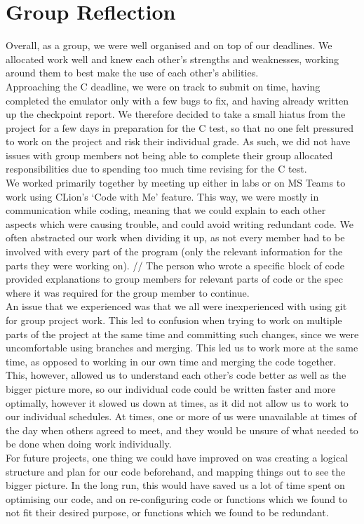 \documentclass [10pt] {article}
\begin{document}
\section*{Group Reflection}
Overall, as a group, we were well organised and on top of our deadlines. We allocated work well and knew each other's strengths and weaknesses, working around them to best make the use of each other's abilities.
\vspace {0.3cm}
\\
Approaching the C deadline, we were on track to submit on time, having completed the emulator only with a few bugs to fix, and having already written up the checkpoint report. We therefore decided to take a small hiatus from the project for a few days in preparation for the C test, so that no one felt pressured to work on the project and risk their individual grade. As such, we did not have issues with group members not being able to complete their group allocated responsibilities due to spending too much time revising for the C test.
\vspace {0.3cm}
\\
We worked primarily together by meeting up either in labs or on MS Teams to work using CLion’s ‘Code with Me’ feature. This way, we were mostly in communication while coding, meaning that we could explain to each other aspects which were causing trouble, and could avoid writing redundant code. We often abstracted our work when dividing it up, as not every member had to be involved with every part of the program (only the relevant information for the parts they were working on). // The person who wrote a specific block of code provided explanations to group members for relevant parts of code or the spec where it was required for the group member to continue.
\vspace {0.3cm}
\\
An issue that we experienced was that we all were inexperienced with using git for group project work. This led to confusion when trying to work on multiple parts of the project at the same time and committing such changes, since we were uncomfortable using branches and merging. This led us to work more at the same time, as opposed to working in our own time and merging the code together. This, however, allowed us to understand each other's code better as well as the bigger picture more, so our individual code could be written faster and more optimally, however it slowed us down at times, as it did not allow us to work to our individual schedules. At times, one or more of us were unavailable at times of the day when others agreed to meet, and they would be unsure of what needed to be done when doing work individually.
\vspace {0.3cm}
\\
For future projects, one thing we could have improved on was creating a logical structure and plan for our code beforehand, and mapping things out to see the bigger picture. In the long run, this would have saved us a lot of time spent on optimising our code, and on re-configuring code or functions which we found to not fit their desired purpose, or functions which we found to be redundant.
\end{document}
